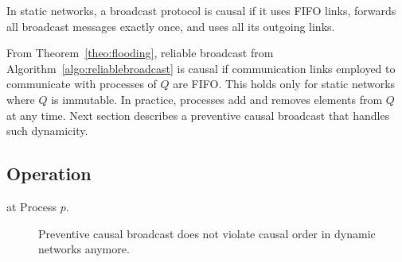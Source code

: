 \begin{theorem}
  In static networks, a broadcast protocol is causal if it uses FIFO links,
  forwards all broadcast messages exactly once, and uses all its outgoing links.
\end{theorem}

From Theorem~\ref{theo:flooding}, reliable broadcast from
Algorithm~\ref{algo:reliablebroadcast} is causal if communication links employed
to communicate with processes of $Q$ are FIFO. This holds only for static
networks where $Q$ is immutable. In practice, processes add and removes elements
from $Q$ at any time. Next section describes a preventive causal broadcast that
handles such dynamicity.


\subsection{Operation}

\begin{algorithm}[h]
  
  \caption{\label{algo:bufferbroadcast}\CBROADCAST at Process $p$.}
\end{algorithm}

\begin{figure*}
  \begin{center}
    \hspace{20pt}
    \hspace{20pt}
    \hspace{20pt}
    \hspace{20pt}
    \caption{\label{fig:preventivesolve}Preventive causal broadcast does not violate
      causal order in dynamic networks anymore.}
  \end{center}
\end{figure*}

